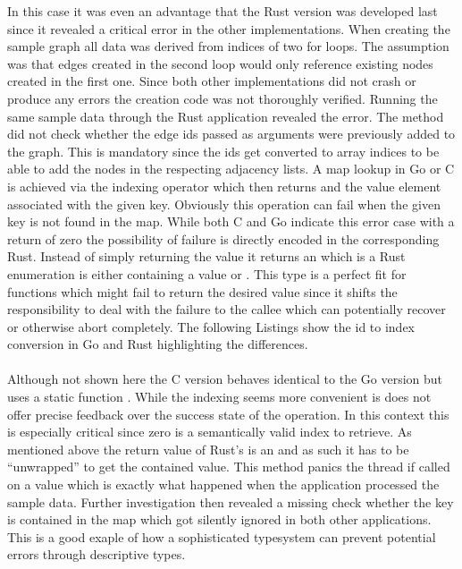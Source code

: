 In this case it was even an advantage that the Rust version was developed last since it revealed a critical error in the other implementations. When creating the sample graph all data was derived from indices of two for loops. The assumption was that edges created in the second loop would only reference existing nodes created in the first one. Since both other implementations did not crash or produce any errors the creation code was not thoroughly verified. Running the same sample data through the Rust application revealed the error. The  method did not check whether the edge ids passed as arguments were previously added to the graph. This is mandatory since the ids get converted to array indices to be able to add the nodes in the respecting adjacency lists. A map lookup in Go or C is achieved via the indexing operator which then returns and the value element associated with the given key. Obviously this operation can fail when the given key is not found in the map. While both C and Go indicate this error case with a return of zero the possibility of failure is directly encoded in the corresponding Rust. Instead of simply returning the value it returns an  which is a Rust enumeration is either containing a value or . This type is a perfect fit for functions which might fail to return the desired value since it shifts the responsibility to deal with the failure to the callee which can potentially recover or otherwise abort completely. The following Listings show the id to index conversion in Go and Rust highlighting the differences.
\\

\\


Although not shown here the C version behaves identical to the Go version but uses a static function . While the indexing seems more convenient is does not offer precise feedback over the success state of the operation. In this context this is especially critical since zero is a semantically valid index to retrieve. As mentioned above the return value of Rust's  is an  and as such it has to be ``unwrapped'' to get the contained value. This method panics the thread if called on a  value which is exactly what happened when the application processed the sample data. Further investigation then revealed a missing check whether the key is contained in the map which got silently ignored in both other applications. This is a good exaple of how a sophisticated typesystem can prevent potential errors through descriptive types.

